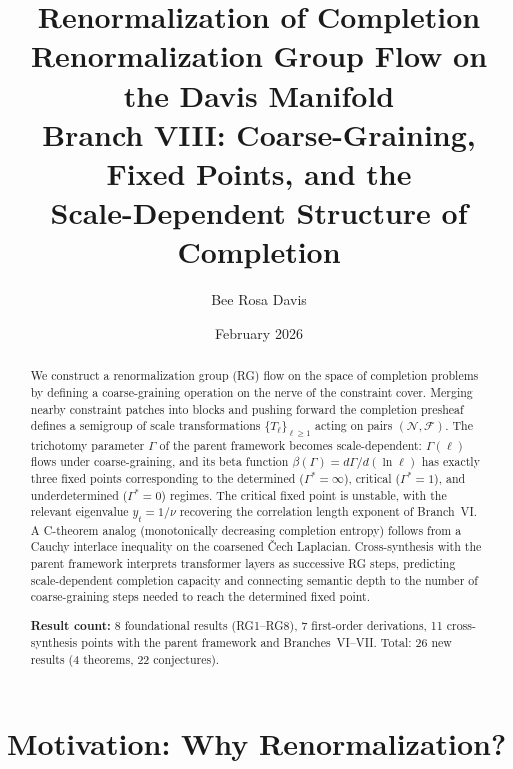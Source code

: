 \documentclass[11pt,letterpaper]{article}
\newcommand{\sheaf}{\mathcal{F}}
\newcommand{\nerve}{\mathcal{N}}
\begin{document}
\title{\textbf{Renormalization of Completion}\\[6pt]
\large Renormalization Group Flow on the Davis Manifold\\[4pt]
\normalsize Branch VIII: Coarse-Graining, Fixed Points, and the\\
Scale-Dependent Structure of Completion}
\author{Bee Rosa Davis}
\date{February 2026}
\maketitle

\begin{abstract}
We construct a renormalization group (RG) flow on the space of 
completion problems by defining a coarse-graining operation on the 
nerve of the constraint cover. Merging nearby constraint patches into 
blocks and pushing forward the completion presheaf defines a 
semigroup of scale transformations $\{T_\ell\}_{\ell \geq 1}$ acting 
on pairs $(\nerve, \sheaf)$. The trichotomy parameter $\Gamma$ of the 
parent framework becomes scale-dependent: $\Gamma(\ell)$ flows under 
coarse-graining, and its beta function $\beta(\Gamma) = 
d\Gamma / d(\ln \ell)$ has exactly three fixed points corresponding 
to the determined ($\Gamma^* = \infty$), critical ($\Gamma^* = 1$), 
and underdetermined ($\Gamma^* = 0$) regimes. The critical fixed 
point is unstable, with the relevant eigenvalue $y_t = 1/\nu$ 
recovering the correlation length exponent of Branch~VI. A 
C-theorem analog (monotonically decreasing completion entropy) 
follows from a Cauchy interlace inequality on the coarsened \v{C}ech 
Laplacian. Cross-synthesis with the parent framework interprets 
transformer layers as successive RG steps, predicting scale-dependent 
completion capacity and connecting semantic depth to the number of 
coarse-graining steps needed to reach the determined fixed point.

\medskip\noindent
\textbf{Result count:} 8 foundational results (RG1--RG8), 7 
first-order derivations, 11 cross-synthesis points with the parent 
framework and Branches~VI--VII. Total: 26 new results (4 theorems, 
22 conjectures).
\end{abstract}

\tableofcontents
\newpage

\section{Motivation: Why Renormalization?}
\end{document}
